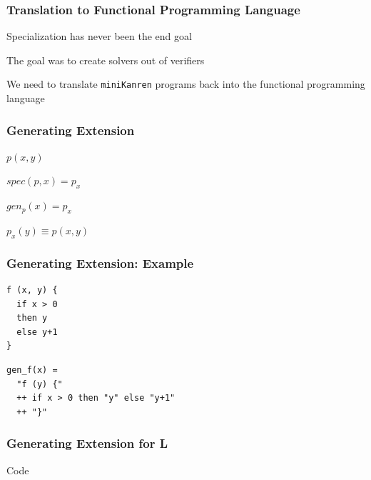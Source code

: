 \documentclass{beamer}
\newcommand{\miniKanren}{\texttt{miniKanren}\xspace}
\begin{document}
\begin{frame}[fragile]
  \frametitle{Translation to Functional Programming Language}

\begin{center}
  Specialization has never been the end goal
\end{center}

\vspace{0.5cm}

\begin{center}
  The goal was to create solvers out of verifiers
\end{center}

\vspace{0.5cm}

\begin{center}
  We need to translate \miniKanren programs back into the functional programming language
\end{center}
\end{frame}


\begin{frame}[fragile]
  \frametitle{Generating Extension}
\begin{center}
  $p(x,y)$
\end{center}

\begin{center}
  $spec(p, x) = p_x$
\end{center}

\begin{center}
  $gen_p(x) = p_x$
\end{center}

\begin{center}
  $p_x(y) \equiv p(x,y)$
\end{center}
\end{frame}


\begin{frame}[fragile]
  \frametitle{Generating Extension: Example}
\begin{verbatim}
f (x, y) {
  if x > 0
  then y
  else y+1
}
\end{verbatim}

\vspace{1cm}

\begin{verbatim}
gen_f(x) =
  "f (y) {"
  ++ if x > 0 then "y" else "y+1"
  ++ "}"
\end{verbatim}
\end{frame}

\begin{frame}[fragile]
  \frametitle{Generating Extension for L}
\begin{center}
  Code
\end{center}
\end{frame}
\end{document}
